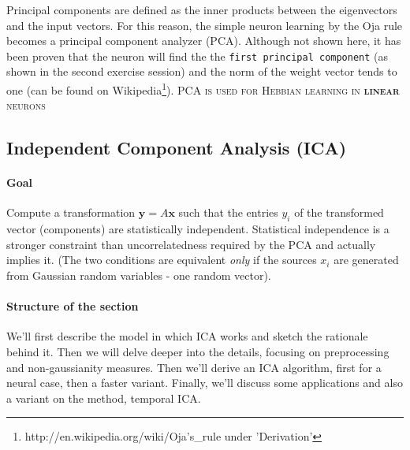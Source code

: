 \documentclass[11pt]{article}
\begin{document}
Principal components are defined as the inner products between the eigenvectors and the input vectors. For this reason, the simple neuron learning by the Oja rule becomes a principal component analyzer (PCA).
Although not shown here, it has been proven that the neuron will find the the \texttt{first principal component} (as shown in the second exercise session) and the norm of the weight vector tends to one (can be found on Wikipedia\footnote{http://en.wikipedia.org/wiki/Oja's\_rule under 'Derivation'}).
\textsc{PCA is used for Hebbian learning in \textbf{linear} neurons}

\subsection{Independent Component Analysis (ICA)}

\paragraph{Goal} Compute a transformation $\mathbf{y}=A\mathbf{x}$ such that the entries $y_i$ of the transformed vector (components) are statistically independent. Statistical independence is a stronger constraint than uncorrelatedness required by the PCA and actually implies it. (The two conditions are equivalent \textit{only} if the sources $x_i$ are generated from Gaussian random variables - one random vector). 
\paragraph{Structure of the section} We'll first describe the model in which ICA works and sketch the rationale behind it. Then we will delve deeper into the details, focusing on preprocessing and non-gaussianity measures. Then we'll derive an ICA algorithm, first for a neural case, then a faster variant. Finally, we'll discuss some applications and also a variant on the method, temporal ICA.
\end{document}
